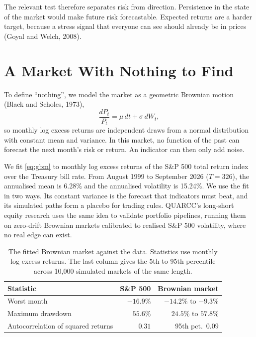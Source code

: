 \documentclass[10pt,twocolumn,letterpaper]{article}
\begin{document}
The relevant test therefore separates risk from direction. Persistence in the state of the market would make future risk forecastable. Expected returns are a harder target, because a stress signal that everyone can see should already be in prices (Goyal and Welch, 2008).

\section{A Market With Nothing to Find}

To define ``nothing'', we model the market as a geometric Brownian motion (Black and Scholes, 1973),
\begin{equation}
\frac{dP_t}{P_t} = \mu\,dt + \sigma\,dW_t, \label{eq:gbm}
\end{equation}
so monthly log excess returns are independent draws from a normal distribution with constant mean and variance. In this market, no function of the past can forecast the next month's risk or return. An indicator can then only add noise.

We fit \eqref{eq:gbm} to monthly log excess returns of the S\&P 500 total return index over the Treasury bill rate. From August 1999 to September 2026 ($T = 326$), the annualised mean is 6.28\% and the annualised volatility is 15.24\%. We use the fit in two ways. Its constant variance is the forecast that indicators must beat, and its simulated paths form a placebo for trading rules. QUARCC's long-short equity research uses the same idea to validate portfolio pipelines, running them on zero-drift Brownian markets calibrated to realised S\&P 500 volatility, where no real edge can exist.

\begin{table}[h]
\centering
\caption{The fitted Brownian market against the data. Statistics use monthly log excess returns. The last column gives the 5th to 95th percentile across 10,000 simulated markets of the same length.}
\label{tab:gbm}
\footnotesize
\setlength{\tabcolsep}{4pt}
\begin{tabular}{lrr}
\toprule
Statistic & S\&P 500 & Brownian market \\
\midrule
Worst month & $-16.9\%$ & $-14.2\%$ to $-9.3\%$ \\
Maximum drawdown & $55.6\%$ & $24.5\%$ to $57.8\%$ \\
Autocorrelation of squared returns & $0.31$ & 95th pct.\ $0.09$ \\
\bottomrule
\end{tabular}
\end{table}
\end{document}
